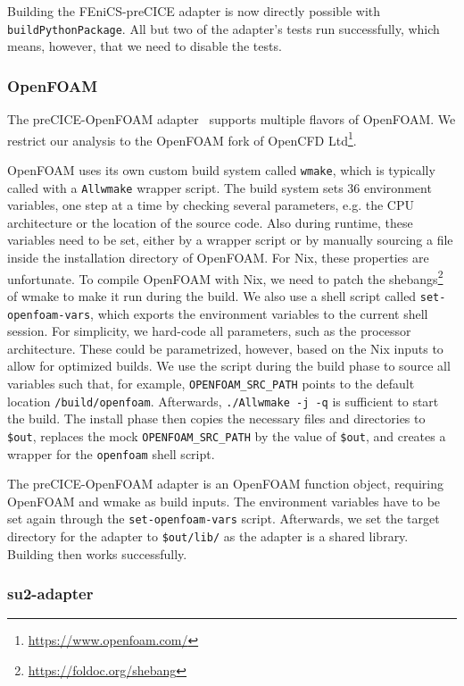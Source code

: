 \documentclass{eceasst}
\begin{document}
Building the FEniCS-preCICE adapter is now directly possible with \texttt{buildPythonPackage}.
All but two of the adapter's tests run successfully, which means, however, that we need to disable the tests.

\subsubsection{OpenFOAM}

The preCICE-OpenFOAM adapter~\cite{OpenFOAMpreCICE} supports multiple flavors of OpenFOAM. We restrict our analysis to the OpenFOAM fork of OpenCFD Ltd\footnote{\url{https://www.openfoam.com/}}.

OpenFOAM uses its own custom build system called \texttt{wmake}, which is typically called with a \texttt{Allwmake} wrapper script.
The build system sets 36 environment variables, one step at a time by checking several parameters, e.g. the CPU architecture or the location of the source code. Also during runtime, these variables need to be set, either by a wrapper script or by manually sourcing a file inside the installation directory of OpenFOAM.
For Nix, these properties are unfortunate. To compile OpenFOAM with Nix, we need to patch the shebangs\footnote{\url{https://foldoc.org/shebang}} of wmake to make it run during the build.
We also use a shell script called \texttt{set-openfoam-vars}, which exports the environment variables to the current shell session.
For simplicity, we hard-code all parameters, such as the processor architecture. These could be parametrized, however, based on the Nix inputs to allow for optimized builds. We use the script during the build phase to source all variables such that, for example, \texttt{OPENFOAM\_SRC\_PATH} points to the default location \texttt{/build/openfoam}.
Afterwards, \texttt{./Allwmake -j -q} is sufficient to start the build.
The install phase then copies the necessary files and directories to \texttt{\$out}, replaces the mock \texttt{OPENFOAM\_SRC\_PATH} by the value of \texttt{\$out}, and creates a wrapper for the \texttt{openfoam} shell script.

The preCICE-OpenFOAM adapter is an OpenFOAM function object, requiring OpenFOAM and wmake as build inputs.
The environment variables have to be set again through the \texttt{set-openfoam-vars} script.
Afterwards, we set the target directory for the adapter to \texttt{\$out/lib/} as the adapter is a shared library. Building then works successfully.

\subsubsection{su2-adapter}
\end{document}
